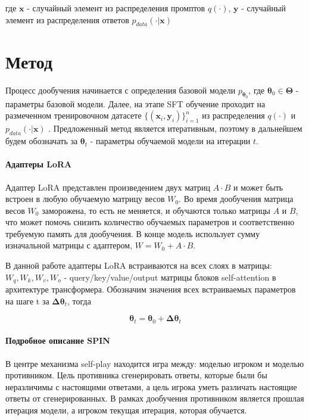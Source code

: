 \documentclass[12pt, twoside]{article}
\newcommand{\bx}{\mathbf{x}}
\newcommand{\by}{\mathbf{y}}
\newcommand{\btheta}{\boldsymbol{\theta}}
\newcommand{\bTheta}{\boldsymbol{\Theta}}
\newcommand{\bDelta}{\boldsymbol{\Delta}}
\begin{document}
где $\bx$ - случайный элемент из распределения промптов $q(\cdot)$, $\by$ - случайный элемент из распределения ответов $p_{data}(\cdot |\bx)$

\vspace{10}

\section{Метод}

Процесс дообучения начинается с определения базовой модели $p_{\btheta_0}$, где $\btheta_0 \in \bTheta$ - параметры базовой модели. Далее, на этапе SFT обучение проходит на размеченном тренировочном датасете $\{(\bx_i, \by_i)\}_{i=1}^n$ из распределения $q(\cdot)$ и $p_{data}(\cdot | \bx)$ . Предложенный метод является итеративным, поэтому в дальнейшем будем обозначать за $\btheta_t$ - параметры обучаемой модели на итерации $t$.

\paragraph{Адаптеры LoRA}
Адаптер LoRA представлен произведением двух матриц $A \cdot B$ и может быть встроен в любую обучаемую матрицу весов $W_0$. Во время дообучения матрица весов $W_0$ заморожена, то есть не меняется, и обучаются только матрицы $A$ и $B$, что может помочь снизить количество обучаемых параметров и соответственно требуемую память для дообучения. В конце модель использует сумму изначальной матрицы с адаптером, $W = W_0 + A \cdot B$.

В данной работе адаптеры LoRA встраиваются на всех слоях в матрицы: $W_q, W_k, W_v, W_o$ - query/key/value/output матрицы блоков self-attention в архитектуре трансформера. Обозначим значения всех встраиваемых параметров на шаге t за $\bDelta\btheta_t$, тогда

$$\btheta_t = \btheta_0 + \bDelta\btheta_t$$

\paragraph{Подробное описание SPIN}

В центре механизма self-play находится игра между: моделью игроком и моделью противником. Цель противника сгенерировать ответы, которые были бы неразличимы с настоящими ответами, а цель игрока уметь различать настоящие ответы от сгенерированных. В рамках дообучения противником является прошлая итерация модели, а игроком текущая итерация, которая обучается.
\end{document}
